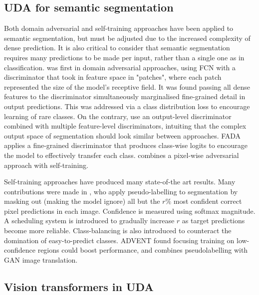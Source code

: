 \documentclass[a4paper,12pt]{report}
\begin{document}
\subsection*{UDA for semantic segmentation}

Both domain adversarial and self-training approaches have been applied to semantic segmentation, but must be adjusted due to the increased complexity of dense prediction. It is also critical to consider that semantic segmentation requires many predictions to be made per input, rather than a single one as in classification. \cite{hoffman_fcns_2016} was first in domain adversarial approaches, using FCN with a discriminator that took in feature space in "patches", where each patch represented the size of the model's receptive field. It was found passing all dense features to the discriminator simultaneously marginalised fine-grained detail in output predictions. This was addressed via a class distribution loss to encourage learning of rare classes. On the contrary, \cite{tsai_learning_2020} use an output-level discriminator combined with multiple feature-level discriminators, intuiting that the complex output space of segmentation should look similar between approaches. FADA \cite{wang_classes_2020} applies a fine-grained discriminator that produces class-wise logits to encourage the model to effectively transfer each class. \cite{michieli_adversarial_2020} combines a pixel-wise adversarial approach with self-training.

Self-training approaches have produced many state-of-the art results. Many contributions were made in \cite{zou_domain_2018}, who apply pseudo-labelling to segmentation by masking out (making the model ignore) all but the $r\%$ most confident correct pixel predictions in each image. Confidence is measured using softmax magnitude. A scheduling system is introduced to gradually increase $r$ as target predictions become more reliable. Class-balancing is also introduced to counteract the domination of easy-to-predict classes. ADVENT \cite{vu_advent_2019} found focusing training on low-confidence regions could boost performance, and \cite{li_bidirectional_2019} combines pseudolabelling with GAN image translation.

\subsection*{Vision transformers in UDA}
\end{document}
